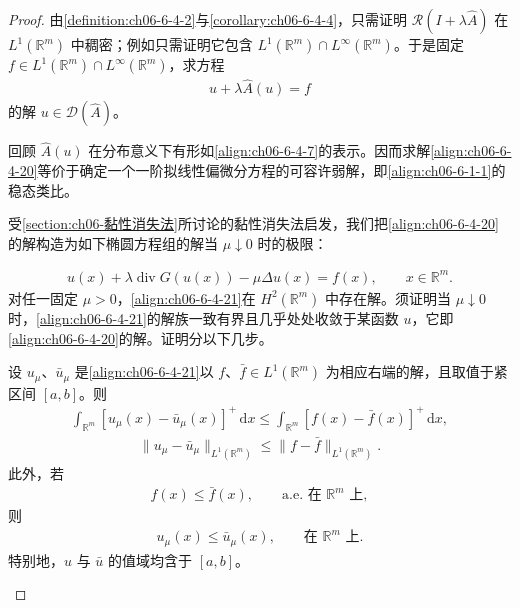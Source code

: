 \documentclass[../../main.tex]{subfiles}
\begin{document}
\begin{proof}
由\cref{definition:ch06-6-4-2}与\cref{corollary:ch06-6-4-4}，只需证明 $\mathscr{R}(I+\lambda\hat{A})$ 在 $L^{1}(\mathbb{R}^{m})$ 中稠密；例如只需证明它包含 $L^{1}(\mathbb{R}^{m})\cap L^{\infty}(\mathbb{R}^{m})$。于是固定 $f\in L^{1}(\mathbb{R}^{m})\cap L^{\infty}(\mathbb{R}^{m})$，求方程
\begin{align}
u+\lambda\hat{A}(u)=f
\label{align:ch06-6-4-20}
\end{align}
的解 $u\in\mathscr{D}(\hat{A})$。

回顾 $\hat{A}(u)$ 在分布意义下有形如\eqref{align:ch06-6-4-7}的表示。因而求解\eqref{align:ch06-6-4-20}等价于确定一个一阶拟线性偏微分方程的可容许弱解，即\eqref{align:ch06-6-1-1}的稳态类比。

受\cref{section:ch06-黏性消失法}所讨论的黏性消失法启发，我们把\eqref{align:ch06-6-4-20}的解构造为如下椭圆方程组的解当 $\mu\downarrow 0$ 时的极限：

\begin{align}
u(x)+\lambda\operatorname{div}G(u(x))-\mu\Delta u(x)=f(x),\qquad x\in\mathbb{R}^{m}.
\label{align:ch06-6-4-21}
\end{align}
对任一固定 $\mu>0$，\eqref{align:ch06-6-4-21}在 $H^{2}(\mathbb{R}^{m})$ 中存在解。须证明当 $\mu\downarrow 0$ 时，\eqref{align:ch06-6-4-21}的解族一致有界且几乎处处收敛于某函数 $u$，它即\eqref{align:ch06-6-4-20}的解。证明分以下几步。

\begin{lemma}\label{lemma:ch06-6-4-6}
设 $u_{\mu}$、$\bar{u}_{\mu}$ 是\eqref{align:ch06-6-4-21}以 $f$、$\bar{f}\in L^{1}(\mathbb{R}^{m})$ 为相应右端的解，且取值于紧区间 $[a,b]$。则
\begin{align}
\int_{\mathbb{R}^{m}}[u_{\mu}(x)-\bar{u}_{\mu}(x)]^{+}\,\mathrm{d}x\leqslant\int_{\mathbb{R}^{m}}[f(x)-\bar{f}(x)]^{+}\,\mathrm{d}x,
\label{align:ch06-6-4-22}
\end{align}
\begin{align}
\|u_{\mu}-\bar{u}_{\mu}\|_{L^{1}(\mathbb{R}^{m})}\leqslant\|f-\bar{f}\|_{L^{1}(\mathbb{R}^{m})}.
\label{align:ch06-6-4-23}
\end{align}
此外，若
\begin{align}
f(x)\leqslant\bar{f}(x),\qquad\text{a.e.\ 在 }\mathbb{R}^{m}\text{ 上},
\label{align:ch06-6-4-24}
\end{align}
则
\begin{align}
u_{\mu}(x)\leqslant\bar{u}_{\mu}(x),\qquad\text{在 }\mathbb{R}^{m}\text{ 上}.
\label{align:ch06-6-4-25}
\end{align}
特别地，$u$ 与 $\bar{u}$ 的值域均含于 $[a,b]$。
\end{lemma}


\end{proof}
\end{document}
